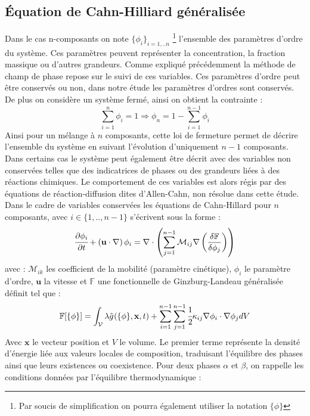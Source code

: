 \subsection{Équation de Cahn-Hilliard généralisée}
Dans le cas n-composants on note $\{\phi_i\}_{i=1,..n}$ \footnote{Par soucis de simplification on pourra également utiliser la notation $\{\phi\}$} l'ensemble des paramètres d'ordre du système. Ces paramètres peuvent représenter la concentration, la fraction massique ou d'autres grandeurs.
Comme expliqué précédemment la méthode de champ de phase repose sur le suivi de ces variables. Ces paramètres d'ordre peut être conservés ou non, dans notre étude les paramètres d'ordres sont conservés. De plus on considère un système fermé, ainsi on obtient la contrainte :
\begin{equation}
\sum_{i=1}^n \phi_i =1 \Rightarrow \phi_n =1 - \sum_{i=1}^{n-1} \phi_i
\end{equation} 
Ainsi pour un mélange à $n$ composants, cette loi de fermeture permet de décrire l'ensemble du système en suivant l'évolution d'uniquement $n-1$ composants. Dans certains cas le système peut également être décrit avec des variables non conservées telles que des indicatrices de phases ou des grandeurs liées à des réactions chimiques. Le comportement de ces variables est alors régis par des équations de réaction-diffusion dites d'Allen-Cahn, non résolue dans cette étude. Dans le cadre de variables conservées les équations de Cahn-Hillard pour $n$ composants, avec $i\in \{1,..,n-1 \}$ s'écrivent sous la forme :
\begin{equation}
	\cfrac{\partial \phi_i}{\partial t} + \left(\mathbf{u} \cdot \nabla\right) \phi_i =  \nabla \cdot \left(\sum_{j=1}^{n-1}{\mathcal{M}_{ij}} \nabla\left( \frac{\delta \mathbb{F}}{\delta \phi_j}\right) \right) 
\end{equation}
avec : $\mathcal{M}_{ik}$ les coefficient de la mobilité (paramètre cinétique),  $\phi_i$ le paramètre d'ordre, $\mathbf{u}$ la vitesse et $\mathbb{F}$ une fonctionnelle de Ginzburg-Landeau généralisée \cite{cardon_modelisation_2016} définit tel que : 
 \begin{equation}
\mathbb{F}[\{\phi\}] = \int_{\mathcal{V}}\lambda\tilde{g}^{}(\{\phi\},\mathbf{x},t)+ \sum_{i=1}^{n-1}\sum_{j=1}^{n-1}\cfrac{1}{2}\kappa_{ij}\nabla \phi_i \cdot \nabla \phi_j dV
\end{equation}
Avec $\mathbf{x}$ le vecteur position et $V$ le volume.
Le premier terme représente la densité d'énergie liée aux valeurs locales de composition, traduisant l'équilibre des phases ainsi que leurs existences ou coexistence. Pour deux phases $\alpha$ et $\beta$, on rappelle les conditions données par l'équilibre thermodynamique \cite{kim_phase-field_1999} :

